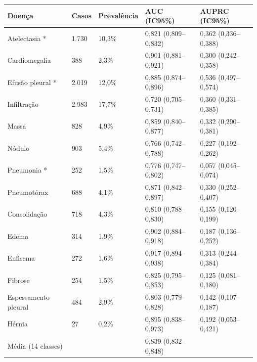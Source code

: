 \begin{tabular}{lllll}
\toprule
Doença & Casos & Prevalência & AUC (IC95\%) & AUPRC (IC95\%) \\
\midrule
Atelectasia * & 1.730 & 10,3\% & 0,821 (0,809–0,832) & 0,362 (0,336–0,388) \\
Cardiomegalia & 388 & 2,3\% & 0,901 (0,881–0,921) & 0,300 (0,242–0,358) \\
Efusão pleural * & 2.019 & 12,0\% & 0,885 (0,874–0,896) & 0,536 (0,497–0,574) \\
Infiltração & 2.983 & 17,7\% & 0,720 (0,705–0,731) & 0,360 (0,331–0,385) \\
Massa & 828 & 4,9\% & 0,859 (0,840–0,877) & 0,332 (0,290–0,381) \\
Nódulo & 903 & 5,4\% & 0,766 (0,742–0,788) & 0,227 (0,192–0,262) \\
Pneumonia * & 252 & 1,5\% & 0,776 (0,747–0,802) & 0,057 (0,045–0,074) \\
Pneumotórax & 688 & 4,1\% & 0,871 (0,842–0,897) & 0,330 (0,252–0,407) \\
Consolidação & 718 & 4,3\% & 0,810 (0,788–0,830) & 0,155 (0,120–0,199) \\
Edema & 314 & 1,9\% & 0,902 (0,884–0,918) & 0,187 (0,136–0,252) \\
Enfisema & 272 & 1,6\% & 0,917 (0,894–0,938) & 0,313 (0,244–0,384) \\
Fibrose & 254 & 1,5\% & 0,825 (0,795–0,853) & 0,125 (0,081–0,180) \\
Espessamento pleural & 484 & 2,9\% & 0,803 (0,779–0,828) & 0,142 (0,107–0,187) \\
Hérnia & 27 & 0,2\% & 0,895 (0,838–0,973) & 0,192 (0,053–0,421) \\
Média (14 classes) &  &  & 0,839 (0,832–0,848) &  \\
\bottomrule
\end{tabular}
